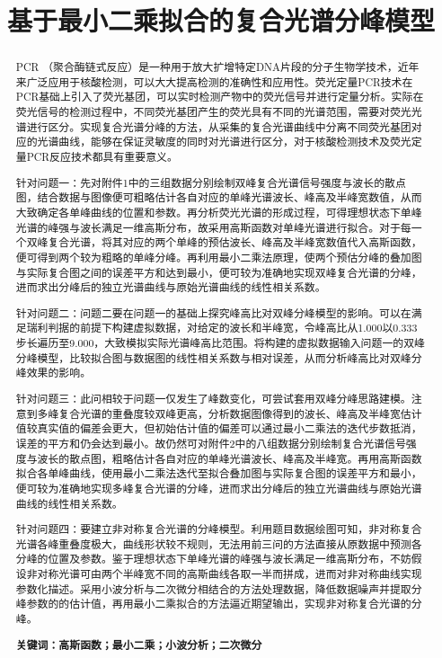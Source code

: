 \documentclass{article}
\date{}
\title{\heiti 基于最小二乘拟合的复合光谱分峰模型}
\numberwithin{equation}{subsection}
\begin{document}
\maketitle
\vspace{-5em}%
\begin{abstract}

    PCR （聚合酶链式反应）是一种用于放大扩增特定DNA片段的分子生物学技术，近年来广泛应用于核酸检测，可以大大提高检测的准确性和应用性。荧光定量PCR技术在PCR基础上引入了荧光基团，可以实时检测产物中的荧光信号并进行定量分析。实际在荧光信号的检测过程中，不同荧光基团产生的荧光具有不同的光谱范围，需要对荧光光谱进行区分。实现复合光谱分峰的方法，从采集的复合光谱曲线中分离不同荧光基团对应的光谱曲线，能够在保证灵敏度的同时对光谱进行区分，对于核酸检测技术及荧光定量PCR反应技术都具有重要意义。
    
    针对问题一：先对附件1中的三组数据分别绘制双峰复合光谱信号强度与波长的散点图，结合数据与图像便可粗略估计各自对应的单峰光谱波长、峰高及半峰宽数值，从而大致确定各单峰曲线的位置和参数。再分析荧光光谱的形成过程，可得理想状态下单峰光谱的峰强与波长满足一维高斯分布，故采用高斯函数对单峰光谱进行拟合。对于每一个双峰复合光谱，将其对应的两个单峰的预估波长、峰高及半峰宽数值代入高斯函数，便可得到两个较为粗略的单峰分峰。再利用最小二乘法原理，使两个预估分峰的叠加图与实际复合图之间的误差平方和达到最小，便可较为准确地实现双峰复合光谱的分峰，进而求出分峰后的独立光谱曲线与原始光谱曲线的线性相关系数。
    
    针对问题二：问题二要在问题一的基础上探究峰高比对双峰分峰模型的影响。可以在满足瑞利判据的前提下构建虚拟数据，对给定的波长和半峰宽，令峰高比从1.000以0.333步长遍历至9.000，大致模拟实际光谱峰高比范围。将构建的虚拟数据输入问题一的双峰分峰模型，比较拟合图与数据图的线性相关系数与相对误差，从而分析峰高比对双峰分峰效果的影响。
    
    针对问题三：此问相较于问题一仅发生了峰数变化，可尝试套用双峰分峰思路建模。注意到多峰复合光谱的重叠度较双峰更高，分析数据图像得到的波长、峰高及半峰宽估计值较真实值的偏差会更大，但初始估计值的偏差可以通过最小二乘法的迭代步数抵消，误差的平方和仍会达到最小。故仍然可对附件2中的八组数据分别绘制复合光谱信号强度与波长的散点图，粗略估计各自对应的单峰光谱波长、峰高及半峰宽。再用高斯函数拟合各单峰曲线，使用最小二乘法迭代至拟合叠加图与实际复合图的误差平方和最小，便可较为准确地实现多峰复合光谱的分峰，进而求出分峰后的独立光谱曲线与原始光谱曲线的线性相关系数。
    
    针对问题四：要建立非对称复合光谱的分峰模型。利用题目数据绘图可知，非对称复合光谱各峰重叠度极大，曲线形状较不规则，无法用前三问的方法直接从原数据中预测各分峰的位置及参数。鉴于理想状态下单峰光谱的峰强与波长满足一维高斯分布，不妨假设非对称光谱可由两个半峰宽不同的高斯曲线各取一半而拼成，进而对非对称曲线实现参数化描述。采用小波分析与二次微分相结合的方法处理数据，降低数据噪声并提取分峰参数的的估计值，再用最小二乘拟合的方法逼近期望输出，实现非对称复合光谱的分峰。
    
    \textbf{关键词：高斯函数；最小二乘；小波分析；二次微分}

\end{abstract}
\end{document}
